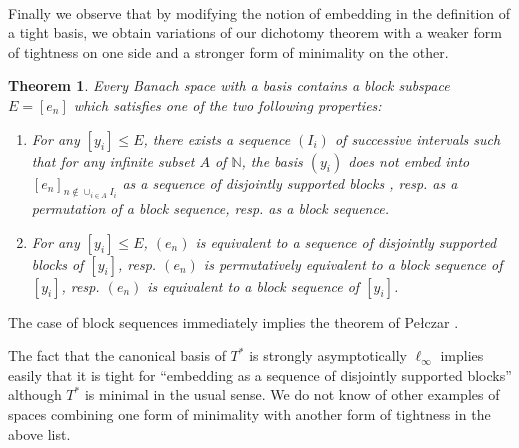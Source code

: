 \documentclass[10pt]{amsart}
\numberwithin{equation}{section}
\newtheorem{thm}{Theorem}[section]
\begin{document}
\

Finally we observe that by modifying the notion of embedding in the definition
of a tight basis, we obtain variations of our dichotomy theorem with a weaker
form of tightness on one side and a stronger form of minimality on the other.

\begin{thm}
Every Banach space with a basis contains a block subspace $E=[e_n]$ which satisfies one of the two following properties:
\begin{enumerate}
\item For any $[y_i] {\ensuremath{\leqslant}} E$, there exists a sequence $(I_i)$ of successive
intervals such that for any infinite subset $A$ of ${\mathbb N}$, the basis $(y_i)$
does not embed into $[e_n]_{n \notin \cup_{i \in A}I_i}$ as a sequence of
disjointly supported blocks , resp. as a permutation of a block sequence,
resp. as a block sequence.
\item For any $[y_i] {\ensuremath{\leqslant}} E$,  $(e_n)$ is equivalent to a sequence of disjointly
supported blocks of $[y_i]$, resp. $(e_n)$ is permutatively equivalent to a
block sequence of $[y_i]$, resp. $(e_n)$ is equivalent to a block sequence
of $[y_i]$.
\end{enumerate}
\end{thm}
The case of block sequences immediately implies the theorem of Pe\l czar \cite{anna}.

The fact that the canonical basis of $T^*$ is strongly asymptotically
$\ell_{\infty}$  implies easily that it is tight for ``embedding as a sequence
of disjointly supported blocks'' although $T^*$ is minimal in the usual sense.
We do not know of other examples of spaces combining one form of  minimality
with another form of  tightness in the above list.
\end{document}
